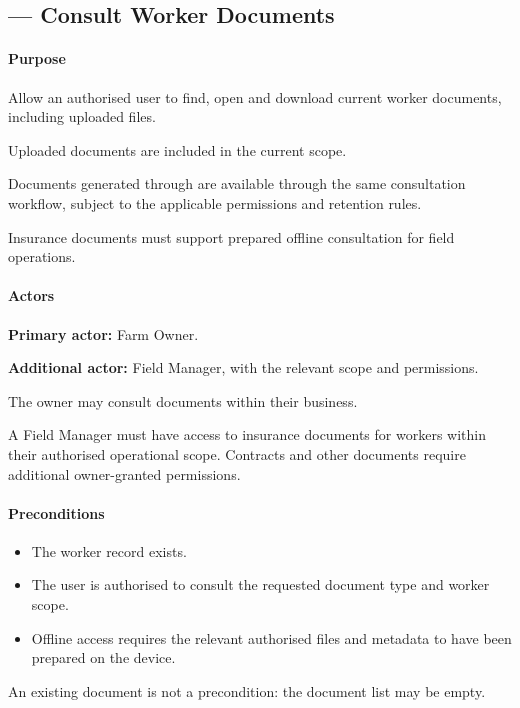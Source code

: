 \subsection{ --- Consult Worker Documents}
\label{uc:12}

\paragraph{Purpose}

Allow an authorised user to find, open
and download current worker documents,
including uploaded files.

Uploaded documents are included in the current scope.

Documents generated through  are available through the same consultation
workflow, subject to the applicable permissions and retention rules.

Insurance documents must support prepared
offline consultation for field operations.


\paragraph{Actors}

\textbf{Primary actor:} Farm Owner.

\textbf{Additional actor:} Field Manager,
with the relevant scope and permissions.

The owner may consult documents within
their business.

A Field Manager must have access to insurance
documents for workers within their authorised
operational scope.
Contracts and other documents require
additional owner-granted permissions.

\paragraph{Preconditions}

\begin{itemize}
    \item The worker record exists.
    \item The user is authorised to consult
    the requested document type and worker scope.
    \item Offline access requires the relevant
    authorised files and metadata
    to have been prepared on the device.
\end{itemize}

An existing document is not a precondition:
the document list may be empty.

